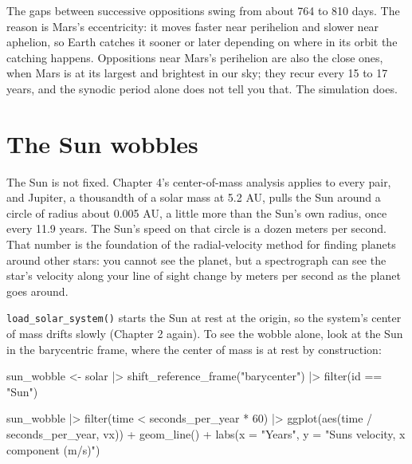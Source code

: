 \documentclass[
  10.5pt,
  letterpaper,
]{scrbook}
\newenvironment{Shaded}{\begin{snugshade}}{\end{snugshade}}
\newcommand{\AttributeTok}[1]{\textcolor[rgb]{0.00,0.00,0.00}{#1}}
\newcommand{\DecValTok}[1]{\textcolor[rgb]{0.00,0.00,0.00}{#1}}
\newcommand{\FunctionTok}[1]{\textcolor[rgb]{0.00,0.00,0.00}{#1}}
\newcommand{\NormalTok}[1]{\textcolor[rgb]{0.00,0.00,0.00}{#1}}
\newcommand{\OtherTok}[1]{\textcolor[rgb]{0.00,0.00,0.00}{#1}}
\newcommand{\SpecialCharTok}[1]{\textcolor[rgb]{0.00,0.00,0.00}{#1}}
\newcommand{\StringTok}[1]{\textcolor[rgb]{0.00,0.00,0.00}{#1}}
\theoremstyle{definition}
\theoremstyle{plain}
\theoremstyle{remark}
\begin{document}
The gaps between successive oppositions swing from about 764 to 810
days. The reason is Mars's eccentricity: it moves faster near perihelion
and slower near aphelion, so Earth catches it sooner or later depending
on where in its orbit the catching happens. Oppositions near Mars's
perihelion are also the close ones, when Mars is at its largest and
brightest in our sky; they recur every 15 to 17 years, and the synodic
period alone does not tell you that. The simulation does.

\section{The Sun wobbles}\label{the-sun-wobbles}

The Sun is not fixed. Chapter 4's center-of-mass analysis applies to
every pair, and Jupiter, a thousandth of a solar mass at 5.2 AU, pulls
the Sun around a circle of radius about 0.005 AU, a little more than the
Sun's own radius, once every 11.9 years. The Sun's speed on that circle
is a dozen meters per second. That number is the foundation of the
radial-velocity method for finding planets around other stars: you
cannot see the planet, but a spectrograph can see the star's velocity
along your line of sight change by meters per second as the planet goes
around.

\texttt{load\_solar\_system()} starts the Sun at rest at the origin, so
the system's center of mass drifts slowly (Chapter 2 again). To see the
wobble alone, look at the Sun in the barycentric frame, where the center
of mass is at rest by construction:

\begin{Shaded}
\begin{Highlighting}[]
\NormalTok{sun\_wobble }\OtherTok{\textless{}{-}}\NormalTok{ solar }\SpecialCharTok{|\textgreater{}}
  \FunctionTok{shift\_reference\_frame}\NormalTok{(}\StringTok{"barycenter"}\NormalTok{) }\SpecialCharTok{|\textgreater{}}
  \FunctionTok{filter}\NormalTok{(id }\SpecialCharTok{==} \StringTok{"Sun"}\NormalTok{)}
\end{Highlighting}
\end{Shaded}

\begin{Shaded}
\begin{Highlighting}[]
\NormalTok{sun\_wobble }\SpecialCharTok{|\textgreater{}}
  \FunctionTok{filter}\NormalTok{(time }\SpecialCharTok{\textless{}}\NormalTok{ seconds\_per\_year }\SpecialCharTok{*} \DecValTok{60}\NormalTok{) }\SpecialCharTok{|\textgreater{}}
  \FunctionTok{ggplot}\NormalTok{(}\FunctionTok{aes}\NormalTok{(time }\SpecialCharTok{/}\NormalTok{ seconds\_per\_year, vx)) }\SpecialCharTok{+}
  \FunctionTok{geom\_line}\NormalTok{() }\SpecialCharTok{+}
  \FunctionTok{labs}\NormalTok{(}\AttributeTok{x =} \StringTok{"Years"}\NormalTok{, }\AttributeTok{y =} \StringTok{"Sun\textquotesingle{}s velocity, x component (m/s)"}\NormalTok{)}
\end{Highlighting}
\end{Shaded}
\end{document}
